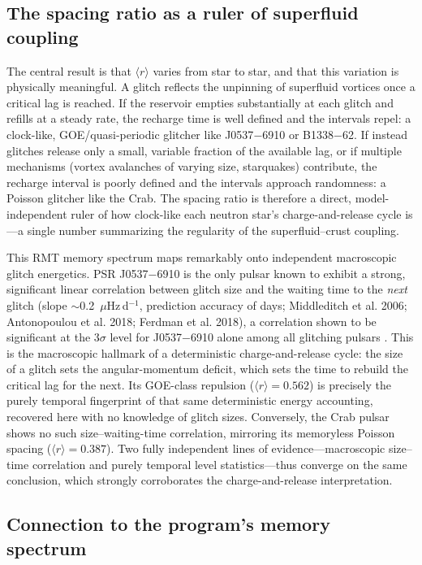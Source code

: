 \documentclass[12pt,a4paper]{article}
\begin{document}
\subsection{The spacing ratio as a ruler of superfluid coupling}

The central result is that $\langle r\rangle$ varies from star to star, and that this variation is physically meaningful. A glitch reflects the unpinning of superfluid vortices once a critical lag is reached. If the reservoir empties substantially at each glitch and refills at a steady rate, the recharge time is well defined and the intervals repel: a clock-like, GOE/quasi-periodic glitcher like J0537$-$6910 or B1338$-$62. If instead glitches release only a small, variable fraction of the available lag, or if multiple mechanisms (vortex avalanches of varying size, starquakes) contribute, the recharge interval is poorly defined and the intervals approach randomness: a Poisson glitcher like the Crab. The spacing ratio is therefore a direct, model-independent ruler of how clock-like each neutron star's charge-and-release cycle is---a single number summarizing the regularity of the superfluid--crust coupling.

This RMT memory spectrum maps remarkably onto independent macroscopic glitch energetics. PSR J0537$-$6910 is the only pulsar known to exhibit a strong, significant linear correlation between glitch size and the waiting time to the \emph{next} glitch (slope $\sim$0.2~$\mu$Hz\,d$^{-1}$, prediction accuracy of days; Middleditch et al. 2006; Antonopoulou et al. 2018; Ferdman et al. 2018), a correlation shown to be significant at the 3$\sigma$ level for J0537$-$6910 alone among all glitching pulsars \citep{fuentes2019}. This is the macroscopic hallmark of a deterministic charge-and-release cycle: the size of a glitch sets the angular-momentum deficit, which sets the time to rebuild the critical lag for the next. Its GOE-class repulsion ($\langle r\rangle=0.562$) is precisely the purely temporal fingerprint of that same deterministic energy accounting, recovered here with no knowledge of glitch sizes. Conversely, the Crab pulsar shows no such size--waiting-time correlation, mirroring its memoryless Poisson spacing ($\langle r\rangle=0.387$). Two fully independent lines of evidence---macroscopic size--time correlation and purely temporal level statistics---thus converge on the same conclusion, which strongly corroborates the charge-and-release interpretation.

\subsection{Connection to the program's memory spectrum}
\end{document}
